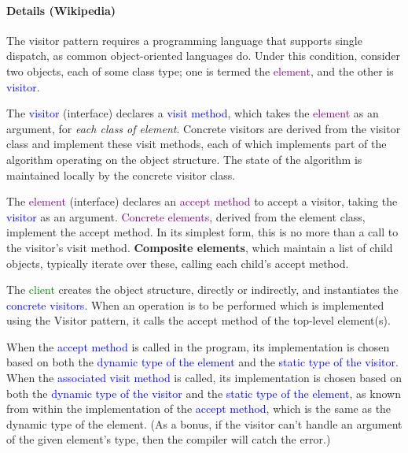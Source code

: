 \documentclass{book}
\begin{document}
\paragraph{Details (Wikipedia)}
\begin{figure}[h]
\begin{floatrow}
\end{floatrow}
\end{figure}

The visitor pattern requires a programming language that supports single dispatch, as common object-oriented languages do.
Under this condition, consider two objects, each of some class type; one is termed the \textcolor{purple}{element}, and the other is \textcolor{blue}{visitor}.

The \textcolor{blue}{visitor} (interface) declares a \textcolor{blue}{visit method}, which takes the \textcolor{purple}{element} as an argument, for \textit{each class of element}.
Concrete visitors are derived from the visitor class and implement these visit methods, 
each of which implements part of the algorithm operating on the object structure. 
The state of the algorithm is maintained locally by the concrete visitor class.

The \textcolor{purple}{element} (interface) declares an \textcolor{purple}{accept method} to accept a visitor, taking the \textcolor{blue}{visitor} as an argument.
\textcolor{purple}{Concrete elements}, derived from the element class, implement the accept method. 
In its simplest form, this is no more than a call to the visitor’s visit method. 
\textbf{Composite elements}, which maintain a list of child objects, typically iterate over these, calling each child’s accept method.

The \textcolor{green}{client} creates the object structure, directly or indirectly, and instantiates the \textcolor{blue}{concrete visitors}.
When an operation is to be performed which is implemented using the Visitor pattern, it calls the accept method of the top-level element(s).

When the \textcolor{blue}{accept method} is called in the program, its implementation is chosen based on 
both the \textcolor{blue}{dynamic type of the element} and the \textcolor{blue}{static type of the visitor}.
When the \textcolor{blue}{associated visit method} is called, its implementation is chosen based on 
both the \textcolor{blue}{dynamic type of the visitor} and the \textcolor{blue}{static type of the element},
as known from within the implementation of the \textcolor{blue}{accept method},
which is the same as the dynamic type of the element. (As a bonus, if the visitor can't handle an argument of the given element's type, then the compiler will catch the error.)
\end{document}
